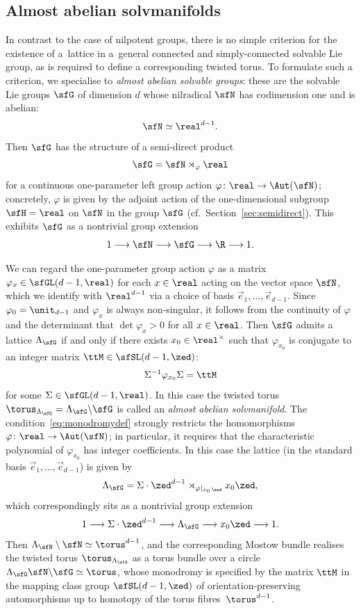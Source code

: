 \subsection{Almost abelian solvmanifolds}\label{sec:abeliansolv}

In contrast to the case of nilpotent groups, there is no
simple criterion for the existence of a~lattice in a~general
connected and simply-connected solvable Lie group, as is required to define a corresponding twisted
torus. To formulate such a criterion, we specialise to \emph{almost
abelian solvable groups}: these are the solvable Lie groups $\sfG$ of
dimension $d$
whose nilradical $\sfN$ has codimension one and is abelian:
\[
\sfN \simeq \real^{d-1} .
\]
Then $\sfG$ has the
structure of a semi-direct product
\[
\sfG = \sfN\rtimes_\varphi\real
\]
for a continuous one-parameter left group action
$\varphi\colon \real\to\Aut(\sfN)$; concretely, $\varphi$ is given by the
adjoint action of the one-dimensional subgroup $\sfH=\real$ on $\sfN$
in the group $\sfG$ (cf.~Section~\ref{sec:semidirect}). This exhibits
$\sfG$ as a nontrivial group extension
\[
1\longrightarrow \sfN \longrightarrow \sfG \longrightarrow \R \longrightarrow 1 .
\]

We can regard the one-parameter group action $\varphi$ as a matrix
$\varphi_x\in\sfGL(d-1,\real)$ for each $x\in\real$ acting on the
vector space $\sfN$, which we identify with $\real^{d-1}$ via a choice
of basis $\vec e_1,\ldots,\vec e_{d-1}$. Since
$\varphi_{0}=\unit_{d-1}$ and $\varphi_x$ is always non-singular, it
follows from the continuity of $\varphi$ and the determinant that
$\det\varphi_x>0$ for all $x\in\real$. Then $\sfG$ admits a lattice
$\Lambda_\sfG$ if and
only if there exists $x_0\in\real^\times$ such that $\varphi_{x_0}$ is
conjugate to an integer matrix $\ttM\in\sfSL(d-1,\zed)$:
\begin{gather}\label{eq:monodromydef}
\Sigma^{-1} \varphi_{x_0} \Sigma=\ttM
\end{gather}
for some
$\Sigma\in\sfGL(d-1,\real)$.
In this case the twisted torus
$\torus_{\Lambda_\sfG}=\Lambda_{\sfG}\backslash \sfG$ is called an {\emph{almost abelian solvmanifold}}.
The condition~\eqref{eq:monodromydef} strongly restricts the homomorphisms
$\varphi\colon \real\to\Aut(\sfN)$; in particular, it requires that the
characteristic polynomial of $\varphi_{x_0}$ has integer
coefficients. In this case the lattice (in the standard basis $\vec
e_1,\ldots,\vec e_{d-1}$) is given by
\[%
\Lambda_\sfG = \Sigma\cdot\zed^{d-1}\rtimes_{\varphi|_{x_0\,\zed}}
x_0 \zed ,
\]
which correspondingly sits as a nontrivial group extension
\[
1\longrightarrow \Sigma \cdot \zed^{d-1} \longrightarrow \Lambda_\sfG
\longrightarrow x_0 \zed \longrightarrow 1 .
\]
Then $\Lambda_{\sfN}\setminus\sfN\simeq\torus^{d-1}$, and the corresponding Mostow bundle realises the twisted torus
$\torus_{\Lambda_\sfG}$ as a torus bundle over a circle
$\Lambda_\sfG \sfN\backslash\sfG \simeq \torus$, whose monodromy
is specified by the matrix $\ttM$ in the mapping class group $\sfSL(d-1,\zed)$ of
orientation-preserving
automorphisms up to homotopy of the torus fibres~$\torus^{d-1}$.


